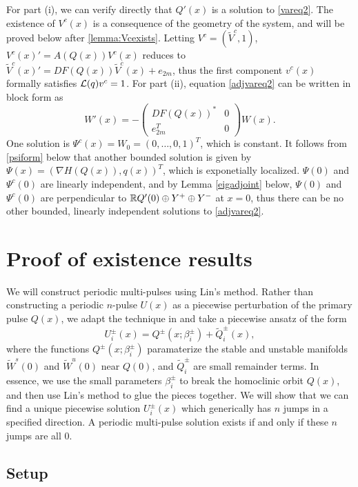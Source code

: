 \documentclass[10pt,reqno]{amsart}
\theoremstyle{plain}
\theoremstyle{definition}
\theoremstyle{remark}
\numberwithin{theorem}{section}
\numberwithin{equation}{section}
\begin{document}
For part (i), we can verify directly that $Q'(x)$ is a solution to \cref{vareq2}. The existence of $V^c(x)$ is a consequence of the geometry of the system, and will be proved below after \cref{lemma:Vcexists}. Letting $V^c = (\tilde{V}^c, 1)$, $V^c(x)' = A(Q(x))V^c(x)$ reduces to $\tilde{V}^c(x)' = DF(Q(x)) \tilde{V}^c(x) + e_{2m}$, thus the first component $v^c(x)$ formally satisfies $\mathcal{L}(q)v^c = 1$. For part (ii), equation \cref{adjvareq2} can be written in block form as
\[
W'(x) = - 
\begin{pmatrix}DF(Q(x))^* & 0 \\ e_{2m}^T & 0 \end{pmatrix} W(x).
\]
One solution is $\Psi^c(x) = W_0 = (0, \dots, 0, 1)^T$, which is constant. It follows from \cref{psiform} below that another bounded solution is given by $\Psi(x) = ( \nabla H(Q(x)), q(x) )^T$, which is exponetially localized. $\Psi(0)$ and $\Psi^c(0)$ are linearly independent, and by Lemma \ref{eigadjoint} below, $\Psi(0)$ and $\Psi^c(0)$ are perpendicular to $\mathbb{R} Q'(0) \oplus Y^+ \oplus Y^-$ at $x = 0$, thus there can be no other bounded, linearly independent solutions to \eqref{adjvareq2}.

\section{Proof of existence results}\label{sec:existproof}

We will construct periodic multi-pulses using Lin's method. Rather than constructing a periodic $n$-pulse $U(x)$ as a piecewise perturbation of the primary pulse $Q(x)$, we adapt the technique in \cite{Sandstede1997} and take a piecewise ansatz of the form
\[
U_i^\pm(x) = Q^\pm(x; \beta_i^\pm) + \tilde{Q}_i^\pm(x),
\]
where the functions $Q^\pm(x; \beta_i^\pm)$ paramaterize the stable and unstable manifolds $\tilde{W}^s(0)$ and $\tilde{W}^u(0)$ near $Q(0)$, and $\tilde{Q}_i^\pm$ are small remainder terms. In essence, we use the small parameters $\beta_i^\pm$ to break the homoclinic orbit $Q(x)$, and then use Lin's method to glue the pieces together. We will show that we can find a unique piecewise solution $U_i^\pm(x)$ which generically has $n$ jumps in a specified direction. A periodic multi-pulse solution exists if and only if these $n$ jumps are all 0.

\subsection{Setup}
\end{document}
